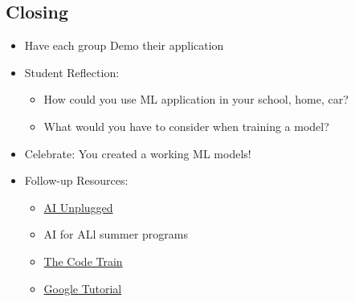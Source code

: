\documentclass[
]{report}
\providecommand{\tightlist}{%
  \setlength{\itemsep}{0pt}\setlength{\parskip}{0pt}}\usepackage{longtable,booktabs,array}
\begin{document}
\hypertarget{closing}{%
\subsection{Closing}\label{closing}}

\begin{itemize}
\tightlist
\item
  Have each group Demo their application
\item
  Student Reflection:

  \begin{itemize}
  \tightlist
  \item
    How could you use ML application in your school, home, car?
  \item
    What would you have to consider when training a model?
  \end{itemize}
\item
  Celebrate: You created a working ML models!\\
\item
  Follow-up Resources:

  \begin{itemize}
  \tightlist
  \item
    \href{https://www.aiunplugged.org/monkey_game.pdf}{AI Unplugged}
  \item
    AI for ALl summer programs
  \item
    \href{https://thecodingtrain.com/}{The Code Train}
  \item
    \href{https://codelabs.developers.google.com/tensorflowjs-transfer-learning-teachable-machine\#6}{Google
    Tutorial}
  \end{itemize}
\end{itemize}
\end{document}
